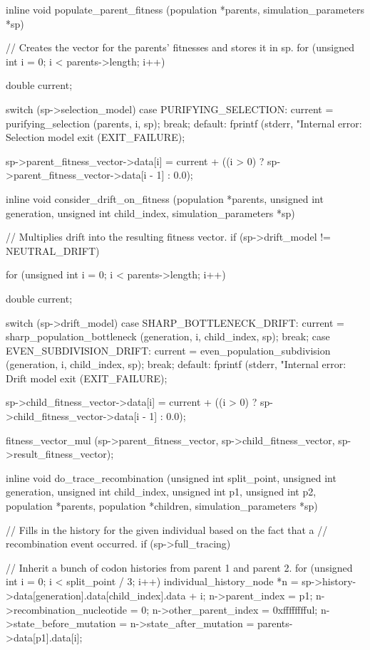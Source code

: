 \documentclass{article}
\begin{document}
\begin{ccode}
inline void populate_parent_fitness (population *parents, simulation_parameters *sp) {
  // Creates the vector for the parents’ fitnesses and stores it in sp.
  for (unsigned int i = 0; i < parents->length; i++) {
    double current;

    switch (sp->selection_model) {
      case PURIFYING_SELECTION:
	current = purifying_selection (parents, i, sp);
	break;
      default:
	fprintf (stderr, "Internal error: Selection model %
	exit (EXIT_FAILURE);
    }

    sp->parent_fitness_vector->data[i] = current +
      ((i > 0) ? sp->parent_fitness_vector->data[i - 1] : 0.0);
  }
}

inline void consider_drift_on_fitness (population *parents, unsigned int generation,
				       unsigned int child_index, simulation_parameters *sp) {
  // Multiplies drift into the resulting fitness vector.
  if (sp->drift_model != NEUTRAL_DRIFT) {
    for (unsigned int i = 0; i < parents->length; i++) {
      double current;

      switch (sp->drift_model) {
        case SHARP_BOTTLENECK_DRIFT:
	  current = sharp_population_bottleneck (generation, i, child_index, sp);
	  break;
        case EVEN_SUBDIVISION_DRIFT:
	  current = even_population_subdivision (generation, i, child_index, sp);
	  break;
        default:
	  fprintf (stderr, "Internal error: Drift model %
	  exit (EXIT_FAILURE);
      }

      sp->child_fitness_vector->data[i] = current +
        ((i > 0) ? sp->child_fitness_vector->data[i - 1] : 0.0);
    }

    fitness_vector_mul (sp->parent_fitness_vector, sp->child_fitness_vector,
                    sp->result_fitness_vector);
  }
}
inline void do_trace_recombination (unsigned int split_point, unsigned int generation,
				    unsigned int child_index, unsigned int p1, unsigned int p2,
				    population *parents, population *children,
				    simulation_parameters *sp) {
  // Fills in the history for the given individual based on the fact that a
  // recombination event occurred.
  if (sp->full_tracing) {
    // Inherit a bunch of codon histories from parent 1 and parent 2.
    for (unsigned int i = 0; i < split_point / 3; i++) {
      individual_history_node *n =
        sp->history->data[generation].data[child_index].data + i;
      n->parent_index = p1;
      n->recombination_nucleotide = 0;
      n->other_parent_index = 0xfffffffful;
      n->state_before_mutation = n->state_after_mutation =
        parents->data[p1].data[i];
    }

}}
\end{ccode}
\end{document}
